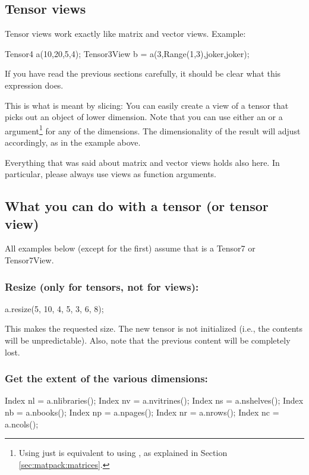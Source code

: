 \subsection{Tensor views}

Tensor views work exactly like matrix and vector views. Example:
\begin{code}
Tensor4 a(10,20,5,4);
Tensor3View b = a(3,Range(1,3),joker,joker);
\end{code}
If you have read the previous sections carefully, it should be clear
what this expression does.

This is what is meant by slicing: You can easily create a view of a
tensor that picks out an object of lower dimension. Note that you can
use either an  or a 
argument\footnote{Using just  is equivalent to using
  , as explained in Section
  \ref{sec:matpack:matrices}.} for any of the dimensions. The
dimensionality of the result will adjust accordingly, as in the
example above.

Everything that was said about matrix and vector views holds also
here. In particular, please always use views as function arguments. 

\subsection{What you can do with a tensor (or tensor view)}

All examples below (except for the first) assume that  is a
Tensor7 or Tensor7View.

\subsubsection{Resize (only for tensors, not for views):}
\begin{code}
a.resize(5, 10, 4, 5, 3, 6, 8);
\end{code}
This makes  the requested size. The new tensor is not
initialized (i.e., the contents will be unpredictable). Also, note
that the previous content will be completely lost.

\subsubsection{Get the extent of the various dimensions:}
\begin{code}
Index nl = a.nlibraries();
Index nv = a.nvitrines();
Index ns = a.nshelves();
Index nb = a.nbooks();
Index np = a.npages();
Index nr = a.nrows();
Index nc = a.ncols();
\end{code}

